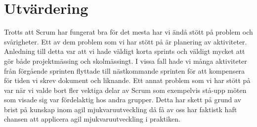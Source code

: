 \section{Utvärdering}
Trotts att Scrum har fungerat bra för det mesta har vi ändå stött på problem och svårigheter. Ett av dem problem som vi har stött på är planering av aktiviteter. Anledning till detta var att vi hade väldigt korta sprints och väldigt mycket att gör både projektmässing och skolmässingt. I vissa fall hade vi många aktiviteter från förgående sprinten flyttade till nästkommande sprinten för att kompensera för tiden vi skrev dokument och liknande. Ett annat problem som vi har stött på var när vi valde bort fler vektiga delar av Scrum som exempelvis stå-upp möten som visade sig var fördelaktig hos andra grupper. Detta har skett på grund av brist på kunskap inom agil mjukvaruutveckling då få av oss har faktistk haft chansen att applicera agil mjukvaruutveckling i praktiken. 